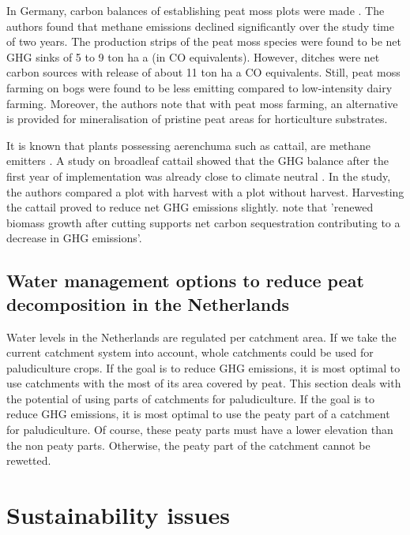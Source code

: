 {\begin{enumerate}
In Germany, carbon balances of establishing peat moss plots were made \citep{gunther2017greenhouse}. The authors found that methane emissions declined significantly over the study time of two years. The production strips of the peat moss  species were found to be net GHG sinks of 5 to 9 ton ha a (in CO equivalents). However, ditches were net carbon sources with release of about 11 ton ha a CO equivalents. Still, peat moss farming on bogs were found to be less emitting compared to low-intensity dairy farming. Moreover, the authors note that with peat moss farming, an alternative is provided for mineralisation of pristine peat areas for horticulture substrates.
 
It is known that plants possessing aerenchuma such as cattail, are methane emitters \citep{wichtmann2016paludiculture}. A study on broadleaf cattail showed that the GHG balance after the first year of implementation was already close to climate neutral \citep{guntherghgtypha}. In the study, the authors compared a plot with harvest with a plot without harvest. Harvesting the cattail proved to reduce net GHG emissions slightly. \citet{wichtmann2016paludiculture} note that 'renewed biomass growth after cutting supports net carbon sequestration contributing to a decrease in GHG emissions'. 

\section{Water management options to reduce peat decomposition in the Netherlands}
Water levels in the Netherlands are regulated per catchment area. If we take the current catchment system into account, whole catchments could be used for paludiculture crops. If the goal is to reduce GHG emissions, it is most optimal to use catchments with the most of its area covered by peat. 
This section deals with the potential of using parts of catchments for paludiculture. If the goal is to reduce GHG emissions, it is most optimal to use the peaty part of a catchment for paludiculture. Of course, these peaty parts must have a lower elevation than the non peaty parts. Otherwise, the peaty part of the catchment cannot be rewetted. 

\chapter{Sustainability issues}


\end{enumerate}}
